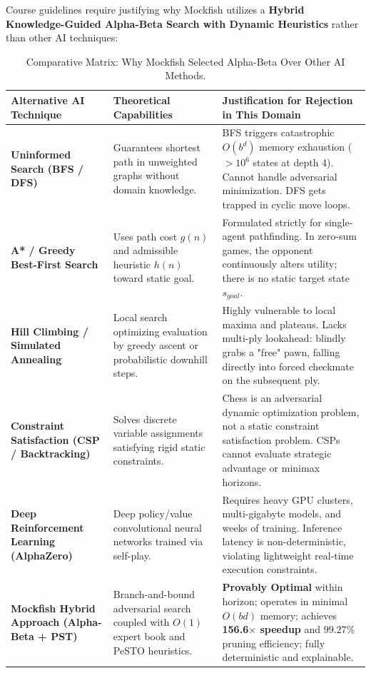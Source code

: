 \documentclass[11pt,a4paper]{article}
\begin{document}
Course guidelines require justifying why Mockfish utilizes a \textbf{Hybrid Knowledge-Guided Alpha-Beta Search with Dynamic Heuristics} rather than other AI techniques:

\begin{table}[htbp]
\centering
\caption{Comparative Matrix: Why Mockfish Selected Alpha-Beta Over Other AI Methods.}
\label{tab:algorithm_justification}
\small
\renewcommand{\arraystretch}{1.3}
\begin{tabularx}{\textwidth}{L{3.0cm} Y Y}
\toprule
\textbf{Alternative AI Technique} & \textbf{Theoretical Capabilities} & \textbf{Justification for Rejection in This Domain} \\
\midrule
\textbf{Uninformed Search (BFS / DFS)} & Guarantees shortest path in unweighted graphs without domain knowledge. & BFS triggers catastrophic $O(b^d)$ memory exhaustion ($>10^6$ states at depth 4). Cannot handle adversarial minimization. DFS gets trapped in cyclic move loops. \\
\textbf{A* / Greedy Best-First Search} & Uses path cost $g(n)$ and admissible heuristic $h(n)$ toward static goal. & Formulated strictly for single-agent pathfinding. In zero-sum games, the opponent continuously alters utility; there is no static target state $s_{goal}$. \\
\textbf{Hill Climbing / Simulated Annealing} & Local search optimizing evaluation by greedy ascent or probabilistic downhill steps. & Highly vulnerable to local maxima and plateaus. Lacks multi-ply lookahead: blindly grabs a "free" pawn, falling directly into forced checkmate on the subsequent ply. \\
\textbf{Constraint Satisfaction (CSP / Backtracking)} & Solves discrete variable assignments satisfying rigid static constraints. & Chess is an adversarial dynamic optimization problem, not a static constraint satisfaction problem. CSPs cannot evaluate strategic advantage or minimax horizons. \\
\textbf{Deep Reinforcement Learning (AlphaZero)} & Deep policy/value convolutional neural networks trained via self-play. & Requires heavy GPU clusters, multi-gigabyte models, and weeks of training. Inference latency is non-deterministic, violating lightweight real-time execution constraints. \\
\midrule
\textbf{Mockfish Hybrid Approach (Alpha-Beta + PST)} & Branch-and-bound adversarial search coupled with $O(1)$ expert book and PeSTO heuristics. & \textbf{Provably Optimal} within horizon; operates in minimal $O(bd)$ memory; achieves \textbf{156.6$\times$ speedup} and $99.27\%$ pruning efficiency; fully deterministic and explainable. \\
\bottomrule
\end{tabularx}
\end{table}
\end{document}
